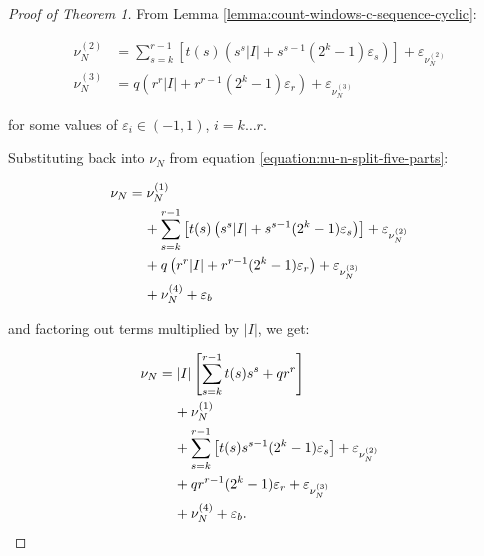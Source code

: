 \documentclass[11pt,a4paper]{tesis}
\theoremstyle{plain}
\theoremstyle{definition}
\begin{document}
\begin{proof}[Proof of Theorem 1]
  From Lemma \ref{lemma:count-windows-c-sequence-cyclic}:

  \begin{equation*}
    \begin{aligned}
      \nu^{(2)}_N & = \sum_{s = k}^{r - 1} \left[ t(s) \left( s^s |I| + s^{s - 1} (2^k - 1) \varepsilon_s \right) \right] + \varepsilon_{\nu^{(2)}_N} \\
      \nu^{(3)}_N & = q \left( r^r |I| + r^{r - 1} (2^k - 1) \varepsilon_r \right)  + \varepsilon_{\nu^{(3)}_N}
    \end{aligned}
  \end{equation*}

  for some values of $\varepsilon_i \in (-1, 1)$, $i = k \dots r$.

  Substituting back into $\nu_N$ from equation \ref{equation:nu-n-split-five-parts}:

  \begin{equation*}
    \begin{aligned}
      \nu_N
        & = \nu^{(1)}_N \\
        & \hspace*{4mm} + \sum_{s = k}^{r - 1} \left[ t(s) \left( s^s |I| + s^{s - 1} (2^k - 1) \varepsilon_s \right) \right] + \varepsilon_{\nu^{(2)}_N} \\
        & \hspace*{4mm} + q \left( r^r |I| + r^{r - 1} (2^k - 1) \varepsilon_r \right)  + \varepsilon_{\nu^{(3)}_N} \\
        & \hspace*{4mm} + \nu^{(4)}_N + \varepsilon_b
    \end{aligned}
  \end{equation*}

  and factoring out terms multiplied by $|I|$, we get:

  \begin{equation*}
    \begin{aligned}
      \nu_N
        & = |I| \left[ \sum_{s = k}^{r - 1} t(s) s^s + q r^r \right] \\
        & \hspace*{4mm} + \nu^{(1)}_N \\
        & \hspace*{4mm} + \sum_{s = k}^{r - 1} \left[ t(s) s^{s - 1} (2^k - 1) \varepsilon_s \right] + \varepsilon_{\nu^{(2)}_N} \\
        & \hspace*{4mm} + q r^{r - 1} (2^k - 1) \varepsilon_r  + \varepsilon_{\nu^{(3)}_N} \\
        & \hspace*{4mm} + \nu^{(4)}_N + \varepsilon_b \text{.}
    \end{aligned}
  \end{equation*}


\end{proof}
\end{document}
